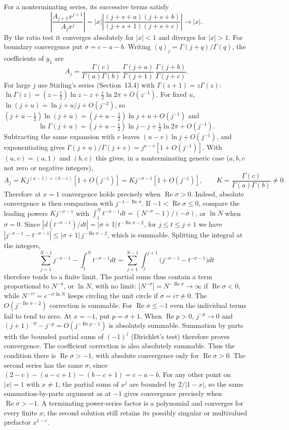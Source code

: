 For a nonterminating series, its successive terms satisfy
\[
\left|\frac{A_{j+1}x^{j+1}}{A_jx^j}\right|
=|x|\left|\frac{(j+s+a)(j+s+b)}{(j+s+1)(j+s+c)}\right|
\longrightarrow |x|.
\]
By the ratio test it converges absolutely for $|x|<1$ and diverges for
$|x|>1$. For boundary convergence put $\sigma=c-a-b$. Writing
$(q)_j=\Gamma(j+q)/\Gamma(q)$, the coefficients of $y_1$ are
\[
A_j=\frac{\Gamma(c)}{\Gamma(a)\Gamma(b)}\,
\frac{\Gamma(j+a)}{\Gamma(j+1)}\,\frac{\Gamma(j+b)}{\Gamma(j+c)}.
\]
For large $j$ use Stirling's series (Section~13.4) with
$\Gamma(z+1)=z\Gamma(z)$:
$\ln\Gamma(z)=(z-\frac12)\ln z-z+\frac12\ln2\pi+O(z^{-1})$. For fixed $u$,
$\ln(j+u)=\ln j+u/j+O(j^{-2})$, so
$(j+u-\frac12)\ln(j+u)=(j+u-\frac12)\ln j+u+O(j^{-1})$ and
\[
\ln\Gamma(j+u)=(j+u-\tfrac12)\ln j-j+\tfrac12\ln2\pi+O(j^{-1}).
\]
Subtracting the same expansion with $v$ leaves $(u-v)\ln j+O(j^{-1})$,
and exponentiating gives
$\Gamma(j+u)/\Gamma(j+v)=j^{u-v}[1+O(j^{-1})]$. With $(u,v)=(a,1)$ and
$(b,c)$ this gives, in a
nonterminating generic case ($a,b,c$ not zero or negative integers),
\[
A_j=Kj^{(a-1)+(b-c)}[1+O(j^{-1})]=Kj^{-\sigma-1}[1+O(j^{-1})],
\qquad K=\frac{\Gamma(c)}{\Gamma(a)\Gamma(b)}\ne0.
\]
Therefore at $x=1$
convergence holds precisely when $\operatorname{Re}\sigma>0$.
Indeed, absolute convergence is then comparison with
$j^{-1-\operatorname{Re}\sigma}$. If $-1<\operatorname{Re}\sigma\le0$,
compare the leading powers $Kj^{-\sigma-1}$ with
$\int_1^Nt^{-\sigma-1}dt=(N^{-\sigma}-1)/(-\sigma)$, or $\ln N$ when
$\sigma=0$. Since
$|d(t^{-\sigma-1})/dt|=|\sigma+1|\,t^{-\operatorname{Re}\sigma-2}$, for
$j\le t\le j+1$ we have
$|j^{-\sigma-1}-t^{-\sigma-1}|\le|\sigma+1|\,j^{-\operatorname{Re}\sigma-2}$,
which is summable. Splitting the integral at the integers,
\[
\sum_{j=1}^{N-1}j^{-\sigma-1}-\int_1^Nt^{-\sigma-1}dt
=\sum_{j=1}^{N-1}\int_j^{j+1}\bigl(j^{-\sigma-1}-t^{-\sigma-1}\bigr)dt
\]
therefore tends to a finite limit. The partial sums thus contain a term
proportional to $N^{-\sigma}$, or $\ln N$, with no limit:
$|N^{-\sigma}|=N^{-\operatorname{Re}\sigma}\to\infty$ if
$\operatorname{Re}\sigma<0$, while $N^{-i\tau}=e^{-i\tau\ln N}$ keeps
circling the unit circle if $\sigma=i\tau\ne0$. The
$O(j^{-\operatorname{Re}\sigma-2})$ correction is summable. For
$\operatorname{Re}\sigma\le-1$ even the individual terms fail to tend
to zero. At $x=-1$, put $p=\sigma+1$. When $\operatorname{Re}p>0$,
$j^{-p}\to0$ and
$(j+1)^{-p}-j^{-p}=O(j^{-\operatorname{Re}p-1})$ is absolutely
summable. Summation by parts with the bounded partial sums of
$(-1)^j$ (Dirichlet's test) therefore proves convergence. The
coefficient correction is
also absolutely summable. Thus the condition there is
$\operatorname{Re}\sigma>-1$, with absolute convergence only for
$\operatorname{Re}\sigma>0$. The second series has the same
$\sigma$, since $(2-c)-(a-c+1)-(b-c+1)=c-a-b$.
For any other point on $|x|=1$ with $x\ne1$, the partial sums of $x^j$
are bounded by $2/|1-x|$, so the same summation-by-parts argument as
at $-1$ gives convergence precisely when $\operatorname{Re}\sigma>-1$.
A terminating power-series factor is a polynomial and converges
for every finite $x$; the second solution still retains its possibly
singular or multivalued prefactor $x^{1-c}$.

